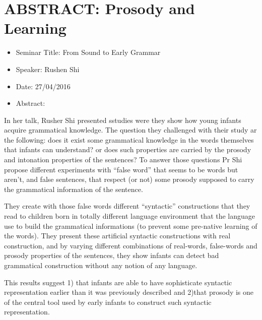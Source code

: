 \documentclass[10pt,letterpaper]{article}
\begin{document}
\section{ABSTRACT: Prosody and Learning}
\begin{itemize}
    \item Seminar Title: From Sound to Early Grammar 
    \item Speaker: Rushen Shi
    \item Date: 27/04/2016
    \item Abstract:
\end{itemize}
In her talk, Rusher Shi presented sstudies were they show how young infants acquire grammatical knowledge. The question they challenged with their study ar the following: does it exist some grammatical knowledge in the words themselves that infants can understand? or does such properties are carried by the prosody and intonation properties of the sentences? To answer those questions Pr Shi propose different experiments with ``false word'' that seems to be words but aren't, and false sentences, that respect (or not) some prosody supposed to carry the grammatical information of the sentence.

They create with those false words different ``syntactic''  constructions that they read to children born in totally different language environment that the language use to build the grammatical informations (to prevent some pre-native learning of the words). They present these artificial syntactic constructions with real construction, and by varying  different combinations of real-words, false-words and prosody properties of the sentences, they show infants can detect bad grammatical construction without any notion of any language. 

This results suggest 1) that infants are able to have sophisticate syntactic representation earlier than it was previously described and 2)that prosody is one of the central tool used by early infants to construct such syntactic representation.

\end{document}
